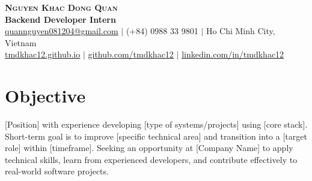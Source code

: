 \documentclass[letterpaper,11pt]{article}
\begin{document}
\begin{flushright}
  \color{gray}
\end{flushright}

\vspace{-5pt}

\begin{center}
  \textbf{\Huge \scshape Nguyen Khac Dong Quan} \\ \vspace{4pt}
  \small \textbf{Backend Developer Intern} \\ \vspace{4pt}
  \small
   \href{mailto:quannguyen081204@gmail.com}{\underline{quannguyen081204@gmail.com}} $|$
   (+84) 0988 33 9801 $|$
   Ho Chi Minh City, Vietnam \\ \vspace{4pt}
   \href{https://tmdkhac12.github.io/}{\underline{tmdkhac12.github.io}} $|$
   \href{https://github.com/tmdkhac12}{\underline{github.com/tmdkhac12}} $|$
   \href{https://linkedin.com/in/tmdkhac12}{\underline{linkedin.com/in/tmdkhac12}}
\end{center}

\section{Objective}
\small{[Position] with experience developing [type of systems/projects] using [core stack].
  Short-term goal is to improve [specific technical area] and transition into a [target role] within [timeframe].
  Seeking an opportunity at [Company Name] to apply technical skills, learn from experienced developers, and contribute effectively to real-world software projects.}

\end{document}
